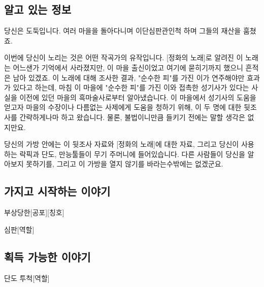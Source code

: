 \documentclass{report}
\begin{document}
	\subsection*{알고 있는 정보}
		당신은 도둑입니다. 여러 마을을 돌아다니며 이단심판관인척 하며 그들의 재산을 훔쳤죠.
		
		이번에 당신이 노리는 것은 어떤 작곡가의 유작입니다. [정화의 노래]로 알려진 이 노래는 어느샌가 기억에서 사라졌지만, 이 마을 출신이었고 여기에 묻히기까지 했으니 흔적은 남아 있겠죠. 이 노래에 대해 조사한 결과, "순수한 피"를 가진 이가 연주해야만 효과가 있다고 하는데, 마침 이 마을에 "순수한 피"를 가진 이와 접촉한 성기사가 있다는 사실을 이전에 있던 마을의 흑마술사로부터 알아냈습니다. 이 마을에서 성기사의 도움을 얻고자 마을의 수장이나 다름없는 사제에게 도움을 청하기 위해, 이 두 명에 대한 뒷조사를 간략하게나마 하고 왔습니다. 물론, 불법이니만큼 들키기 전에는 말할 생각은 없지만요.
		
		당신의 가방 안에는 이 뒷조사 자료와 [정화의 노래]에 대한 자료, 그리고 당신이 사용하는 락픽과 단도, 만능툴들이 무기 주머니에 들어있습니다. 다른 사람들이 당신을 알아보지 못하기를, 그리고 이 가방을 열지 않기를 바라는수밖에는 없겠군요.
	
	\subsection*{가지고 시작하는 이야기}
		\begin{story}{부상당한}{[공포][칭호]}
			
		\end{story}
		
		\begin{story}{심판}{[역할]}
			
		\end{story}
	
	\subsection*{획득 가능한 이야기}
	\begin{story}{단도 투척}{[역할]}
		
	\end{story}
	
\end{document}
